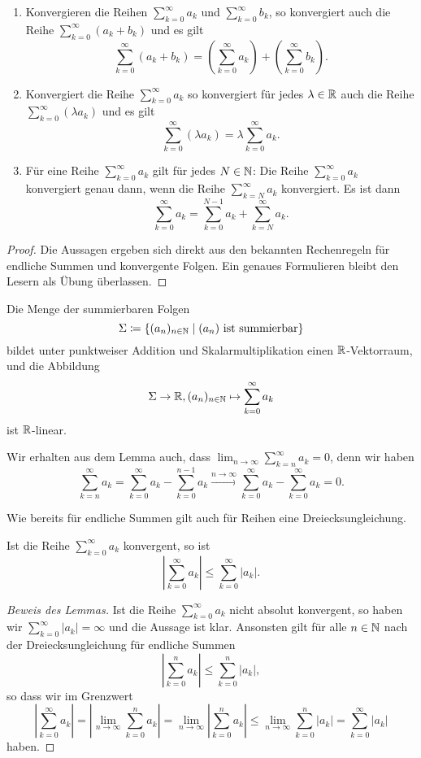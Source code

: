 \documentclass[a4paper,10pt]{article}
\begin{document}
\begin{prop}
 \begin{enumerate}
  \item
   Konvergieren die Reihen $\sum_{k=0}^\infty a_k$ und $\sum_{k=0}^\infty b_k$, so konvergiert auch die Reihe $\sum_{k=0}^\infty (a_k + b_k)$ und es gilt
   \[
    \sum_{k=0}^\infty (a_k + b_k) = \left( \sum_{k=0}^\infty a_k \right) + \left( \sum_{k=0}^\infty b_k \right).
   \]
  \item
   Konvergiert die Reihe $\sum_{k=0}^\infty a_k$ so konvergiert für jedes $\lambda \in \mathbb{R}$ auch die Reihe $\sum_{k=0}^\infty (\lambda a_k)$ und es gilt
   \[
    \sum_{k=0}^\infty (\lambda a_k) = \lambda \sum_{k=0}^\infty a_k.
   \]
  \item
   Für eine Reihe $\sum_{k=0}^\infty a_k$ gilt für jedes $N \in \mathbb{N}$: Die Reihe $\sum_{k=0}^\infty a_k$ konvergiert genau dann, wenn die Reihe $\sum_{k=N}^\infty a_k$ konvergiert. Es ist dann
   \[
    \sum_{k=0}^\infty a_k = \sum_{k=0}^{N-1} a_k + \sum_{k=N}^\infty a_k.
   \]
 \end{enumerate}
\end{prop}
\begin{proof}
 Die Aussagen ergeben sich direkt aus den bekannten Rechenregeln für endliche Summen und konvergente Folgen. Ein genaues Formulieren bleibt den Lesern als Übung überlassen.
\end{proof}


\begin{kor}
 Die Menge der summierbaren Folgen
 \[
  \Sigma \coloneqq \{ (a_n)_{n \in \mathbb{N}} \mid \text{$(a_n)$ ist summierbar}\}
 \]
 bildet unter punktweiser Addition und Skalarmultiplikation einen $\mathbb{R}$-Vektorraum, und die Abbildung
 \[
  \Sigma \to \mathbb{R}, (a_n)_{n \in \mathbb{N}} \mapsto \sum_{k=0}^\infty a_k
 \]
 ist $\mathbb{R}$-linear.
\end{kor}


Wir erhalten aus dem Lemma auch, dass $\lim_{n \to \infty} \sum_{k=n}^\infty a_k = 0$, denn wir haben
\[
 \sum_{k=n}^\infty a_k
 = \sum_{k=0}^\infty a_k - \sum_{k=0}^{n-1} a_k
 \xrightarrow{n \to \infty} \sum_{k=0}^\infty a_k - \sum_{k=0}^\infty a_k
 = 0.
\]


Wie bereits für endliche Summen gilt auch für Reihen eine Dreiecksungleichung.


\begin{lem}
 Ist die Reihe $\sum_{k=0}^\infty a_k$ konvergent, so ist
 \[
  \left| \sum_{k=0}^\infty a_k \right| \leq \sum_{k=0}^\infty |a_k|.
 \]
\end{lem}
\begin{proof}[Beweis des Lemmas]
 Ist die Reihe $\sum_{k=0}^\infty a_k$ nicht absolut konvergent, so haben wir $\sum_{k=0}^\infty |a_k| = \infty$ und die Aussage ist klar. Ansonsten gilt für alle $n \in \mathbb{N}$ nach der Dreiecksungleichung für endliche Summen
 \[
  \left| \sum_{k=0}^n a_k \right| \leq \sum_{k=0}^n |a_k|,
 \]
 so dass wir im Grenzwert
 \[
  \left| \sum_{k=0}^\infty a_k \right|
  = \left| \lim_{n \to \infty} \sum_{k=0}^n a_k \right|
  = \lim_{n \to \infty} \left| \sum_{k=0}^n a_k \right|
  \leq \lim_{n \to \infty} \sum_{k=0}^n |a_k|
  = \sum_{k=0}^\infty |a_k|
 \]
 haben.
\end{proof}
\end{document}
